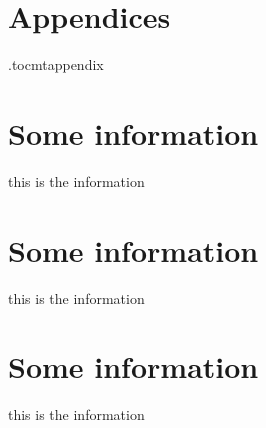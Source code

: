 \newpage
\appendix
\section*{Appendices}
\newpage
\etocdepthtag.toc{mtappendix}
\tableofcontents
\newpage


\section{Some information}
this is the information


\section{Some information}
this is the information


\section{Some information}
this is the information